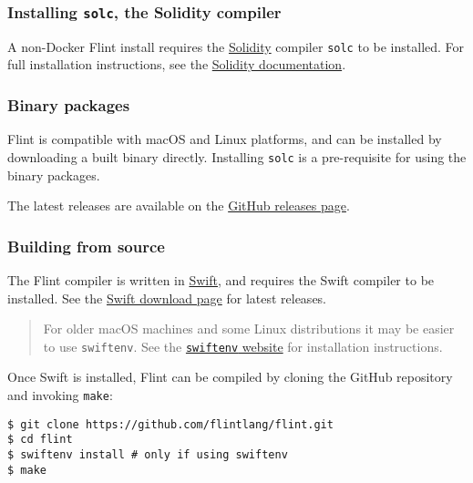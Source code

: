 \subsubsection{Installing \texttt{solc}, the Solidity compiler}
\label{sec:appendix-b-installing-solc-the-solidity-compiler}

A non-Docker Flint install requires the \href{https://github.com/ethereum/solidity}{Solidity} compiler \texttt{solc} to be installed. For full installation instructions, see the \href{https://solidity.readthedocs.io/en/latest/installing-solidity.html}{Solidity documentation}.

\subsubsection{Binary packages}
\label{sec:appendix-b-binary-packages}

Flint is compatible with macOS and Linux platforms, and can be installed by downloading a built binary directly. Installing \texttt{solc} is a pre-requisite for using the binary packages.

The latest releases are available on the \href{https://github.com/flintlang/flint/releases}{GitHub releases page}.

\subsubsection{Building from source}
\label{sec:appendix-b-building-from-source}

The Flint compiler is written in \href{https://swift.org/}{Swift}, and requires the Swift compiler to be installed. See the \href{https://swift.org/download/#releases}{Swift download page} for latest releases.

\begin{quote}
For older macOS machines and some Linux distributions it may be easier to use \texttt{swiftenv}. See the \href{https://swiftenv.fuller.li/en/latest/}{\texttt{swiftenv} website} for installation instructions.
\end{quote}

Once Swift is installed, Flint can be compiled by cloning the GitHub repository and invoking \texttt{make}:

\begin{verbatim}
$ git clone https://github.com/flintlang/flint.git
$ cd flint
$ swiftenv install # only if using swiftenv
$ make
\end{verbatim}

